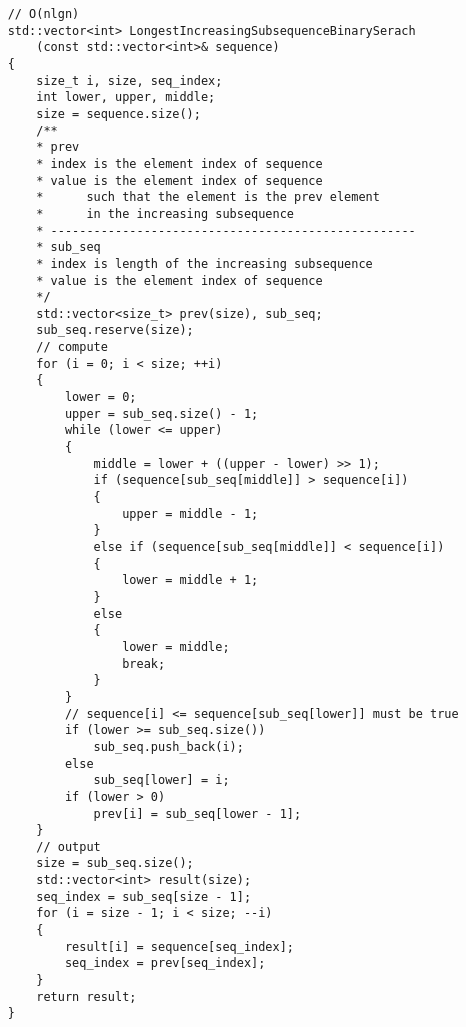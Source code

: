 \begin{verbatim}
    // O(nlgn)
    std::vector<int> LongestIncreasingSubsequenceBinarySerach
        (const std::vector<int>& sequence)
    {
        size_t i, size, seq_index;
        int lower, upper, middle;
        size = sequence.size();
        /**
        * prev
        * index is the element index of sequence
        * value is the element index of sequence 
        *      such that the element is the prev element 
        *      in the increasing subsequence
        * ---------------------------------------------------
        * sub_seq
        * index is length of the increasing subsequence
        * value is the element index of sequence
        */
        std::vector<size_t> prev(size), sub_seq;
        sub_seq.reserve(size);
        // compute
        for (i = 0; i < size; ++i)
        {
            lower = 0;
            upper = sub_seq.size() - 1;
            while (lower <= upper)
            {
                middle = lower + ((upper - lower) >> 1);
                if (sequence[sub_seq[middle]] > sequence[i])
                {
                    upper = middle - 1;
                }
                else if (sequence[sub_seq[middle]] < sequence[i])
                {
                    lower = middle + 1;
                }
                else
                {
                    lower = middle;
                    break;
                }
            }
            // sequence[i] <= sequence[sub_seq[lower]] must be true
            if (lower >= sub_seq.size())
                sub_seq.push_back(i);
            else
                sub_seq[lower] = i;
            if (lower > 0)
                prev[i] = sub_seq[lower - 1];
        }
        // output
        size = sub_seq.size();
        std::vector<int> result(size);
        seq_index = sub_seq[size - 1];
        for (i = size - 1; i < size; --i)
        {
            result[i] = sequence[seq_index];
            seq_index = prev[seq_index];
        }
        return result;
    }
\end{verbatim}


